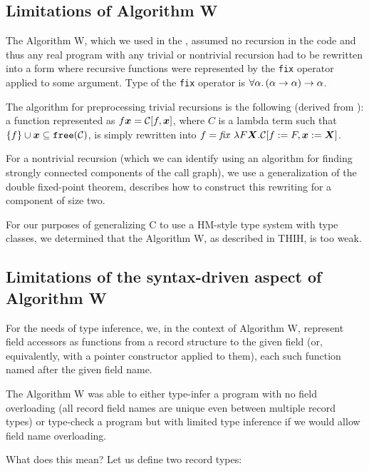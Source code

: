 \subsection{Limitations of Algorithm W}

The Algorithm W, which we used in the , assumed no recursion in the code and thus any real program with any trivial or nontrivial recursion had to be rewritten into a form where recursive functions were represented by the \lstinline{fix} operator applied to some argument. Type of the \lstinline{fix} operator is $\forall \alpha . \left(\alpha \to \alpha\right) \to \alpha$.

The algorithm for preprocessing trivial recursions is the following (derived from ): a function represented as $f \boldsymbol{x} = \mathcal{C}[f, \boldsymbol{x}]$, where $C$ is a lambda term such that $\{f\} \cup \boldsymbol{x} \subseteq \mathtt{free} (\mathcal{C})$, is simply rewritten into $f = \mathit{fix}\ \lambda F \boldsymbol{X} .\mathcal{C}[f := F, \boldsymbol{x} := \boldsymbol{X}]$.

For a nontrivial recursion (which we can identify using an algorithm for finding strongly connected components of the call graph), we use a generalization of the double fixed-point  theorem, describes how to construct this rewriting for a component of size two.

For our purposes of generalizing C to use a HM-style type system with type classes, we determined that the Algorithm W, as described in THIH, is too weak.

\subsection{Limitations of the syntax-driven aspect of Algorithm W}
\label{ex_structs}

\begin{defn}
    For the needs of type inference, we, in the context of Algorithm W, represent field accessors as functions from a record structure to the given field (or, equivalently, with a pointer constructor applied to them), each such function named after the given field name.
\end{defn}

The Algorithm W was able to either type-infer a program with no field overloading (all record field names are unique even between multiple record types) or type-check a program but with limited type inference if we would allow field name overloading.

What does this mean? Let us define two record types:

